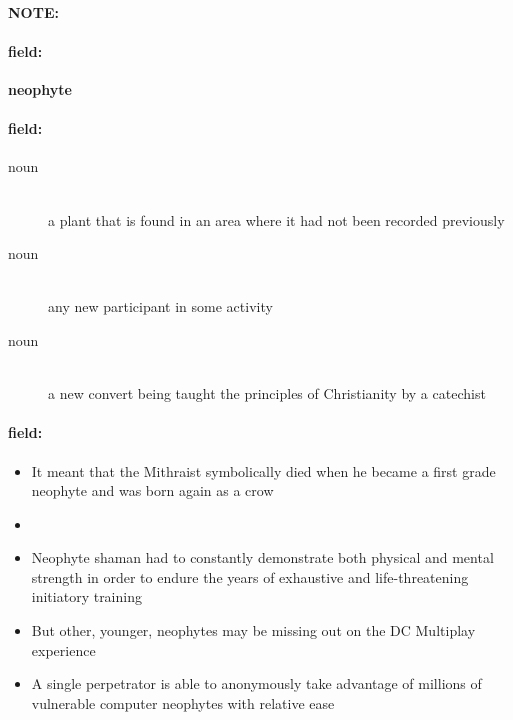 \documentclass[12pt]{article}
\newenvironment{note}{\paragraph{NOTE:}}{}
\newenvironment{field}{\paragraph{field:}}{}
\begin{document}
\begin{note}
\begin{field}
\textbf{\large neophyte}
\end{field}


\begin{field}
\begin{description}
\item[noun] \hfill \\ 
a plant that is found in an area where it had not been recorded previously

\item[noun] \hfill \\ 
any new participant in some activity

\item[noun] \hfill \\ 
a new convert being taught the principles of Christianity by a catechist

\end{description}
\end{field}

\begin{field}
\begin{itemize}
\item It meant that the Mithraist symbolically died when he became a first grade neophyte and was born again as a crow
\item 
\item Neophyte shaman had to constantly demonstrate both physical and mental strength in order to endure the years of exhaustive and life-threatening initiatory training
\item But other, younger, neophytes may be missing out on the DC Multiplay experience
\item A single perpetrator is able to anonymously take advantage of millions of vulnerable computer neophytes with relative ease
\end{itemize}
\end{field}
\end{note}
\end{document}
